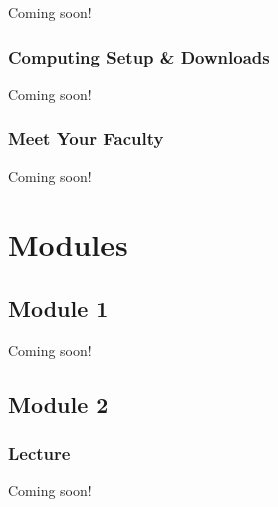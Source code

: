 \documentclass[
]{book}
\begin{document}
Coming soon!

\hypertarget{computing-setup-downloads}{%
\section{Computing Setup \& Downloads}\label{computing-setup-downloads}}

Coming soon!

\hypertarget{meet-your-faculty}{%
\section{Meet Your Faculty}\label{meet-your-faculty}}

Coming soon!

\hypertarget{part-modules}{%
\part{Modules}\label{part-modules}}

\hypertarget{module-1}{%
\chapter{Module 1}\label{module-1}}

Coming soon!

\hypertarget{module-2}{%
\chapter{Module 2}\label{module-2}}

\hypertarget{lecture}{%
\section{Lecture}\label{lecture}}

Coming soon!

  
\end{document}
